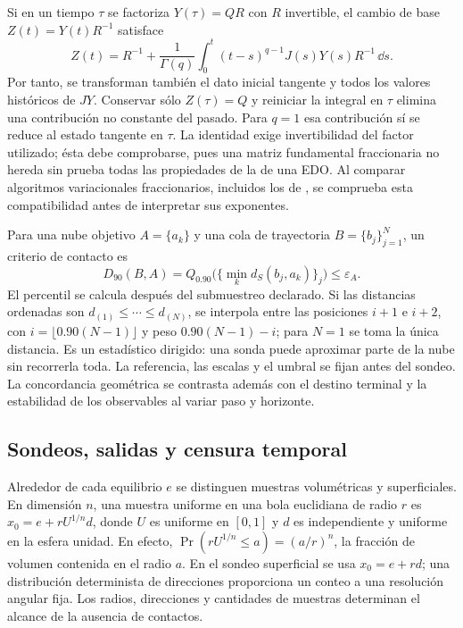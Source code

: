 Si en un tiempo $\tau$ se factoriza $Y(\tau)=QR$ con $R$ invertible,
el cambio de base $Z(t)=Y(t)R^{-1}$ satisface
\begin{equation}
 Z(t)=R^{-1}+\frac1{\Gamma(q)}
 \int_0^t(t-s)^{q-1}J(s)Y(s)R^{-1}\,\dd s.
 \label{bre:num:qr-memory}
\end{equation}
Por tanto, se transforman también el dato inicial tangente y todos los
valores históricos de $JY$. Conservar sólo $Z(\tau)=Q$ y reiniciar la
integral en $\tau$ elimina una contribución no constante del pasado.
Para $q=1$ esa contribución sí se reduce al estado tangente en $\tau$.
La identidad exige invertibilidad del factor utilizado; ésta debe
comprobarse, pues una matriz fundamental fraccionaria no hereda sin prueba
todas las propiedades de la de una EDO.
Al comparar algoritmos variacionales fraccionarios, incluidos los de
\cite{DancaKuznetsov2018Lyapunov}, se comprueba esta compatibilidad antes
de interpretar sus exponentes.

Para una nube objetivo $A=\{a_k\}$ y una cola de trayectoria
$B=\{b_j\}_{j=1}^{N}$, un criterio de contacto es
\begin{equation}
 D_{90}(B,A)=Q_{0.90}\bigl(\{\min_k d_S(b_j,a_k)\}_j\bigr)
 \leq\varepsilon_A.
 \label{bre:num:contacto}
\end{equation}
El percentil se calcula después del submuestreo declarado. Si las distancias
ordenadas son $d_{(1)}\leq\cdots\leq d_{(N)}$, se interpola entre las
posiciones $i+1$ e $i+2$, con $i=\lfloor0.90(N-1)\rfloor$ y peso
$0.90(N-1)-i$; para $N=1$ se toma la única distancia. Es un estadístico
dirigido: una sonda puede aproximar parte de la nube sin recorrerla toda.
La referencia, las escalas y el umbral se fijan antes del sondeo. La
concordancia geométrica se contrasta además con el destino terminal y la
estabilidad de los observables al variar paso y horizonte.

\subsection{Sondeos, salidas y censura temporal}
\label{bre:num:sondeos}

Alrededor de cada equilibrio $e$ se distinguen muestras volumétricas y
superficiales. En dimensión $n$, una muestra uniforme en una bola euclidiana
de radio $r$ es $x_0=e+rU^{1/n}d$, donde $U$ es uniforme en $[0,1]$ y
$d$ es independiente y uniforme en la esfera unidad. En efecto,
$\Pr(rU^{1/n}\leq a)=(a/r)^n$, la fracción de volumen contenida en el
radio $a$. En el sondeo superficial se usa $x_0=e+rd$; una distribución
determinista de direcciones proporciona un conteo a una resolución angular
fija. Los radios, direcciones y cantidades de muestras determinan el alcance
de la ausencia de contactos.

